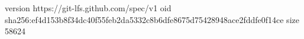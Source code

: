 version https://git-lfs.github.com/spec/v1
oid sha256:ef4d153b8f34dc40f55feb2da5332c8b6dfe8675d75428948ace2fddfe0f14ce
size 58624
